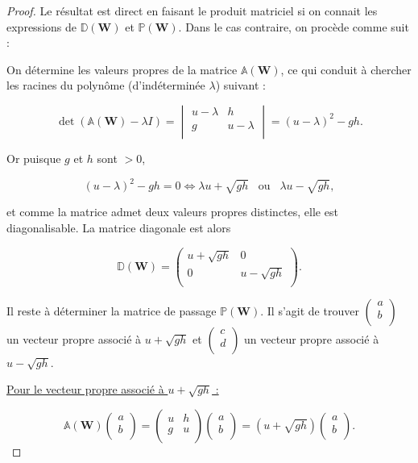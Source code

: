 \documentclass[
11pt, %
francais, %
singlespacing, %
headsepline, %
f%
]{MastersDoctoralThesis} %
\theoremstyle{definition}
\begin{document}
\begin{proof} Le résultat est direct en faisant le produit matriciel si on connait les expressions de $\mathbb{D}(\textbf{W})$ et $\mathbb{P}(\textbf{W})$. Dans le cas contraire, on procède comme suit :


On détermine les valeurs propres de la matrice $\mathbb{A}(\textbf{W})$, ce qui conduit à chercher les racines du polynôme (d'indéterminée $\lambda$) suivant :

$$\det(\mathbb{A}(\textbf{W})-\lambda I) =\begin{vmatrix}
   u-\lambda & h  \\
   g & u-\lambda  \\
\end{vmatrix} = (u-\lambda)^{2}-gh.$$

Or puisque $g$ et $h$ sont $>0$,

$$(u-\lambda)^{2}-gh=0 \Leftrightarrow \lambda u +\sqrt{gh} \phantom{...}\text{ou}\phantom{...} \lambda u -\sqrt{gh},$$

et comme la matrice admet deux valeurs propres distinctes, elle est diagonalisable. La matrice diagonale est alors

$$\mathbb{D}(\textbf{W}) =\begin{pmatrix}
   u+\sqrt{gh} & 0  \\
   0 & u-\sqrt{gh}  \\
\end{pmatrix}.
$$

Il reste à déterminer la matrice de passage $\mathbb{P}(\textbf{W})$. Il s'agit de trouver 
$\begin{pmatrix}
   a\\
   b\\
\end{pmatrix}
$ un vecteur propre associé à $u +\sqrt{gh}$ et
$\begin{pmatrix}
   c\\
   d\\
\end{pmatrix}
$ un vecteur propre associé à $u -\sqrt{gh}$.

\underline{Pour le vecteur propre associé à $u +\sqrt{gh}$ :}


$$\mathbb{A}(\textbf{W}) \begin{pmatrix}
   a\\
   b\\
\end{pmatrix}=\begin{pmatrix}
   u & h  \\
   g & u  \\
\end{pmatrix} \begin{pmatrix}
   a\\
   b\\
\end{pmatrix}=(u+\sqrt{gh})\begin{pmatrix}
   a\\
   b\\
\end{pmatrix}.$$



\end{proof}
\end{document}
